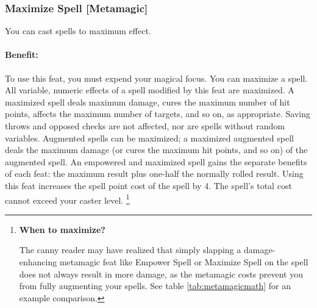 \subsubsection[Maximize Spell]{Maximize Spell [Metamagic]}
\label{Feat:MaximizeSpell}
You can cast spells to maximum effect.

\paragraph{Benefit:} To use this feat, you must expend your magical focus.
You can maximize a spell. All variable, numeric effects of a spell modified by this feat are maximized. 
A maximized spell deals maximum damage, cures the maximum number of hit points, affects the maximum number of targets, and so on, as appropriate. 
Saving throws and opposed checks are not affected, nor are spells without random variables.
Augmented spells can be maximized; a maximized augmented spell deals the maximum damage (or cures the maximum hit points, and so on) of the augmented spell.
An empowered and maximized spell gains the separate benefits of each feat: the maximum result plus one-half the normally rolled result.
Using this feat increases the spell point cost of the spell by 4. The spell's total cost cannot exceed your caster level.
\footnote{\textbf{When to maximize?}

The canny reader may have realized that simply slapping a damage-enhancing metamagic feat like Empower Spell or Maximize Spell
on the spell does not always result in more damage, as the metamagic costs prevent you from fully augmenting your spells.
See table \ref{tab:metamagicmath} for an example comparison.}

